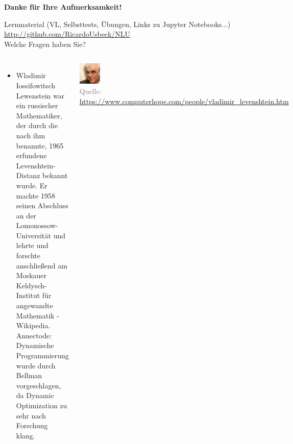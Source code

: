 \documentclass[aspectratio=169]{beamer}
\begin{document}
\begin{frame}{\textbf{Danke für Ihre Aufmerksamkeit!}}
    \begin{center}
        \small{\faGraduationCap \hspace{0.15em} {Lernmaterial (VL, Selbsttests, Übungen, Links zu Jupyter Notebooks...)\\\small{\faGithub \hspace{0.15em} {\href{https://github.com/RicardoUsbeck/NLU}{http://github.com/RicardoUsbeck/NLU}}}}} \\
        \smallskip
        \Huge {Welche Fragen haben Sie?} \\
        
    \end{center}
    \begin{columns}
	\tiny
	\begin{itemize}
	    \item Wladimir Iossifowitsch Lewenstein war ein russischer Mathematiker, der durch die nach ihm benannte, 1965 erfundene Levenshtein-Distanz bekannt wurde. Er machte 1958 seinen Abschluss an der Lomonossow-Universität und lehrte und forschte anschließend am Moskauer Keldysch-Institut für angewandte Mathematik - Wikipedia. Annectode: Dynamische Programmierung wurde durch Bellman vorgeschlagen, da Dynamic Optimization zu sehr nach Forschung klang.
	\end{itemize}
	\centering
	\includegraphics[width=40px,keepaspectratio]{vladimir_levenshtein.jpg}\\
	\tiny \textcolor{gray}{Quelle: \url{https://www.computerhope.com/people/vladimir_levenshtein.htm}}

\end{columns}
\end{frame}
 
\end{document}

